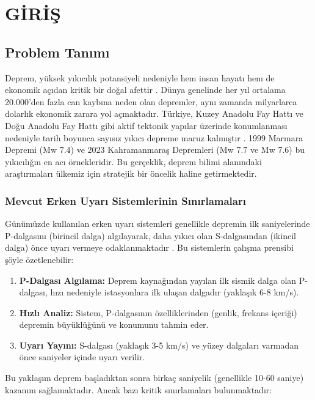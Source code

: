\chapter{GİRİŞ}

\section{Problem Tanımı}

Deprem, yüksek yıkıcılık potansiyeli nedeniyle hem insan hayatı hem de ekonomik açıdan kritik bir doğal afettir \cite{allen2009real}. Dünya genelinde her yıl ortalama 20.000'den fazla can kaybına neden olan depremler, aynı zamanda milyarlarca dolarlık ekonomik zarara yol açmaktadır. Türkiye, Kuzey Anadolu Fay Hattı ve Doğu Anadolu Fay Hattı gibi aktif tektonik yapılar üzerinde konumlanması nedeniyle tarih boyunca sayısız yıkıcı depreme maruz kalmıştır \cite{ambraseys2002seismicity}. 1999 Marmara Depremi (Mw 7.4) ve 2023 Kahramanmaraş Depremleri (Mw 7.7 ve Mw 7.6) bu yıkıcılığın en acı örnekleridir. Bu gerçeklik, deprem bilimi alanındaki araştırmaları ülkemiz için stratejik bir öncelik haline getirmektedir.

\subsection{Mevcut Erken Uyarı Sistemlerinin Sınırlamaları}

Günümüzde kullanılan erken uyarı sistemleri genellikle depremin ilk saniyelerinde P-dalgasını (birincil dalga) algılayarak, daha yıkıcı olan S-dalgasından (ikincil dalga) önce uyarı vermeye odaklanmaktadır \cite{kanamori2005real}. Bu sistemlerin çalışma prensibi şöyle özetlenebilir:

\begin{enumerate}
    \item \textbf{P-Dalgası Algılama:} Deprem kaynağından yayılan ilk sismik dalga olan P-dalgası, hızı nedeniyle istasyonlara ilk ulaşan dalgadır (yaklaşık 6-8 km/s).
    \item \textbf{Hızlı Analiz:} Sistem, P-dalgasının özelliklerinden (genlik, frekans içeriği) depremin büyüklüğünü ve konumunu tahmin eder.
    \item \textbf{Uyarı Yayını:} S-dalgası (yaklaşık 3-5 km/s) ve yüzey dalgaları varmadan önce saniyeler içinde uyarı verilir.
\end{enumerate}

Bu yaklaşım deprem başladıktan sonra birkaç saniyelik (genellikle 10-60 saniye) kazanım sağlamaktadır. Ancak bazı kritik sınırlamaları bulunmaktadır:

